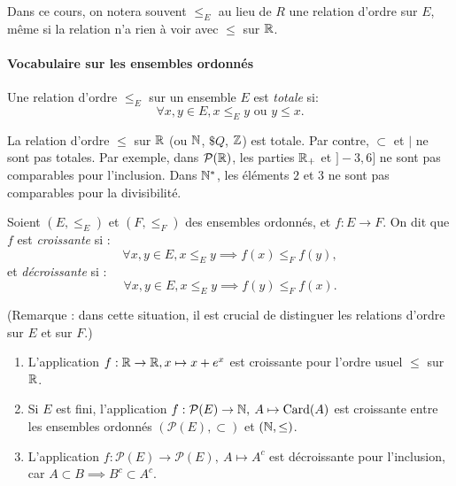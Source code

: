 Dans ce cours, on notera souvent $\leq_E$ au lieu de $R$ une relation d'ordre sur $E$, même si la relation n'a rien à voir avec $\leq$ sur $\mathbb{R}$.


\paragraph{Vocabulaire sur les ensembles ordonnés}

\begin{definition}
Une relation d'ordre $\leq_E$ sur un ensemble $E$ est \emph{totale} si:
\[ \forall x, y\in E, x\leq_Ey\text{ ou } y\leq x.\]
\end{definition}

\begin{exemples}
La relation d'ordre $\leq$ sur $\mathbb{R}$ (ou $\mathbb{N}$, $\$Q$, $\mathbb{Z}$) est totale. Par contre, $\subset$ et $|$ ne sont pas totales. Par exemple, dans $\mathcal P(\mathbb{R})$, les parties $\mathbb{R}_+$ et $]-3,6]$ ne sont pas comparables pour l'inclusion. Dans $\mathbb{N}^*$, les éléments $2$ et $3$ ne sont pas comparables pour la divisibilité.
\end{exemples}

\begin{definition}
Soient $(E,\leq_E)$ et $(F,\leq_F)$ des ensembles ordonnés, et $f : E\to F$. On dit que $f$ est \emph{croissante} si :
\[ \forall x, y\in E, x\leq_E y \implies f(x) \leq_F f(y),\]
et \emph{décroissante} si :
\[\forall x, y\in E, x\leq_E y \implies f(y) \leq_F f(x).\]
\end{definition}

(Remarque : dans cette situation, il est crucial de distinguer les relations d'ordre sur $E$ et sur $F$.)

\begin{exemple}
\begin{enumerate}
\item L'application $f : \mathbb{R}\to \mathbb{R}, x\mapsto x+e^x$ est croissante pour l'ordre usuel $\leq $ sur $\mathbb{R}$.
\item Si $E$ est fini, l'application $f : \mathcal P(E) \to \mathbb{N}, \: A\mapsto \operatorname{Card}(A)$ est croissante entre les ensembles ordonnés $(\mathcal P(E), \subset)$ et $(\mathbb{N}, \leq)$.
\item L'application $f : \mathcal P(E) \to \mathcal P(E), \: A\mapsto A^c$ est décroissante pour l'inclusion, car $A\subset B \implies B^c\subset A^c$.
\end{enumerate}
\end{exemple}

